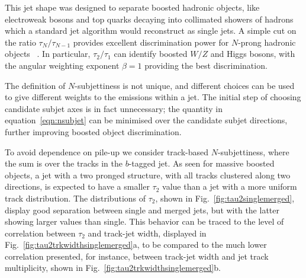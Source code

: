 This jet shape was designed to separate boosted hadronic objects, like electroweak bosons and top quarks decaying into collimated showers of hadrons which a standard jet algorithm would reconstruct as single jets. %
A simple cut on the ratio $\tau_N/\tau_{N-1}$ provides excellent discrimination power for $N$-prong hadronic objects~\cite{nsubjettiness} . In particular, $\tau_2/\tau_1$ can identify boosted $W/Z$ and Higgs bosons, with the angular weighting exponent $\beta =1$ providing the best discrimination.

The definition of $N$-subjettiness is not unique, and different choices can be used to give different weights to the emissions within a jet. The initial step of choosing candidate subjet axes is in fact unnecessary; the quantity in equation~\ref{eqn:nsubjet} can be minimised over the candidate subjet directions, further improving boosted object discrimination.




To avoid dependence on pile-up we consider track-based $N$-subjettiness, where the sum 
 is over the tracks in the $b$-tagged jet. As seen for massive boosted objects, a jet with a two pronged structure, with all tracks clustered along two directions, is expected to have a smaller $\tau_2$ value than a jet with a more uniform track distribution. The distributions of $\tau_2$, shown in Fig.~\ref{fig:tau2singlemerged}, display good separation between single and merged jets, but with the latter showing larger values than single. 
This behavior can be traced to the level of correlation between $\tau_2$ and track-jet width, displayed in Fig.~\ref{fig:tau2trkwidthsinglemerged}a, to be compared to the much lower correlation presented, for instance, between track-jet width and jet track multiplicity, shown in  Fig.~\ref{fig:tau2trkwidthsinglemerged}b. 

